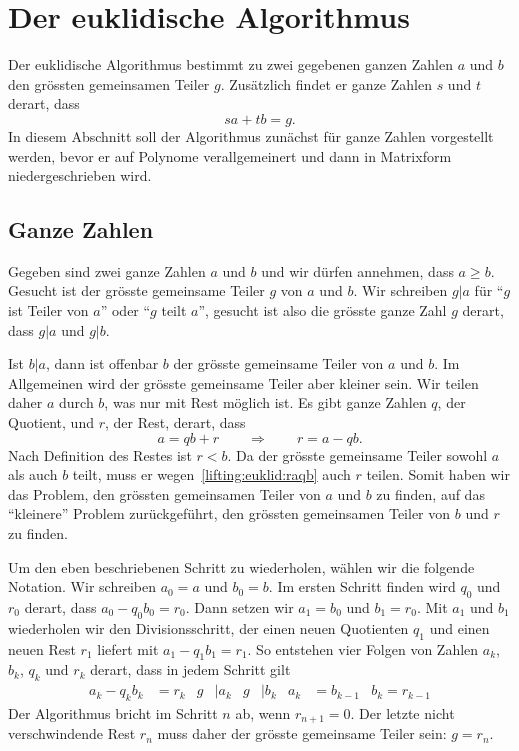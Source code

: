 %
%
%
\section{Der euklidische Algorithmus
\label{buch:section:euklid}}
Der euklidische Algorithmus bestimmt zu zwei gegebenen ganzen
Zahlen $a$ und $b$ den grössten gemeinsamen Teiler $g$.
Zusätzlich findet er ganze Zahlen $s$ und $t$ derart, dass
\[
sa + tb = g.
\]
In diesem Abschnitt soll der Algorithmus zunächst für ganze Zahlen
vorgestellt werden, bevor er auf Polynome verallgemeinert und dann
in Matrixform niedergeschrieben wird.

%
%
\subsection{Ganze Zahlen}
Gegeben sind zwei ganze Zahlen $a$ und $b$ und wir dürfen annehmen,
dass $a\ge b$.
Gesucht ist der grösste gemeinsame Teiler $g$ von $a$ und $b$.
Wir schreiben $g|a$ für ``$g$ ist Teiler von $a$'' oder ``$g$ teilt $a$'',
gesucht ist also die grösste ganze Zahl $g$ derart, dass $g|a$ und $g|b$.

Ist $b|a$, dann ist offenbar $b$ der grösste gemeinsame Teiler von $a$
und $b$.
Im Allgemeinen wird der grösste gemeinsame Teiler aber kleiner sein.
Wir teilen daher $a$ durch $b$, was nur mit Rest möglich ist.
Es gibt ganze Zahlen $q$, der Quotient, und $r$, der Rest, derart, dass
\begin{equation}
a = qb+ r
\qquad \Rightarrow \qquad
r = a - qb.
\label{lifting:euklid:raqb}
\end{equation}
Nach Definition des Restes ist $r < b$.
Da der grösste gemeinsame Teiler sowohl $a$ als auch $b$ teilt, muss er
wegen~\eqref{lifting:euklid:raqb} auch $r$ teilen.
Somit haben wir das Problem, den grössten gemeinsamen Teiler von $a$ und
$b$ zu finden, auf das ``kleinere'' Problem zurückgeführt, den grössten
gemeinsamen Teiler von $b$ und $r$ zu finden.

Um den eben beschriebenen Schritt zu wiederholen, wählen wir die folgende
Notation.
Wir schreiben $a_0=a$ und $b_0=b$.
Im ersten Schritt finden wird $q_0$ und $r_0$ derart,
dass $a_0-q_0b_0 = r_0$.
Dann setzen wir $a_1=b_0$ und $b_1=r_0$.
Mit $a_1$ und $b_1$ wiederholen wir den Divisionsschritt, der einen
neuen Quotienten $q_1$ und einen neuen Rest $r_1$ liefert mit $a_1-q_1b_1=r_1$.
So entstehen vier Folgen von Zahlen $a_k$, $b_k$, $q_k$ und $r_k$ derart,
dass in jedem Schritt gilt
\begin{align*}
a_k - q_kb_k &= r_k & g&|a_k & g&|b_k & a_k &= b_{k-1} & b_k = r_{k-1}
\end{align*}
Der Algorithmus bricht im Schritt $n$ ab, wenn $r_{n+1}=0$.
Der letzte nicht verschwindende Rest $r_n$ muss daher der grösste gemeinsame
Teiler sein: $g=r_n$.

